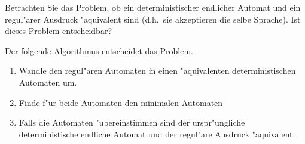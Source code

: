 Betrachten Sie das Problem, ob ein deterministischer endlicher Automat
und ein regul"arer Ausdruck "aquivalent sind (d.h.~sie akzeptieren die
selbe Sprache). Ist dieses Problem entscheidbar?

\begin{loesung}
Der folgende Algorithmus entscheidet das Problem.
\begin{enumerate}
\item Wandle den regul"aren Automaten in einen "aquivalenten deterministischen
Automaten um.
\item Finde f"ur beide Automaten den minimalen Automaten
\item Falls die Automaten "ubereinstimmen sind der urspr"ungliche
deterministische endliche Automat und der regul"are Ausdruck
"aquivalent.
\qedhere
\end{enumerate}
\end{loesung}
